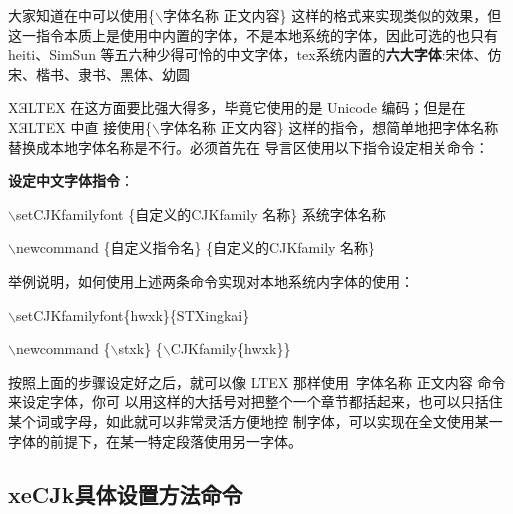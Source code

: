 \documentclass[10pt,a4paper,openany]{article}
\newcommand{\song}{\CJKfamily{song}} %
\begin{document}
	大家知道在\LaTeXe 中可以使用\{$ \backslash $字体名称 正文内容\} 这样的格式来实现类似的效果，但这一指令本质上是使用\LaTeXe 中内置的字体，不是本地系统的字体，因此可选的也只有 heiti、SimSun 等五六种少得可怜的中文字体，tex系统内置的\textbf{六大字体}:{\song 宋体}、{\fangsong 仿宋}、{\kaishu 楷书}、{\lishu 隶书}、{\heiti 黑体}、{\youyuan 幼圆}
	
	XƎLTEX 在这方面要比\LaTeXe 强大得多，毕竟它使用的是 Unicode 编码；但是在 XƎLTEX 中直 接使用\{$ \backslash $字体名称 正文内容\} 这样的指令，想简单地把字体名称替换成本地字体名称是不行。必须首先在 导言区使用以下指令设定相关命令：
	
	\textbf{设定中文字体指令}：
	
    $ \backslash $setCJKfamilyfont \{自定义的CJKfamily 名称\} {系统字体名称}
	
	$ \backslash $newcommand \{自定义指令名\} \{自定义的CJKfamily 名称\}
	
	举例说明，如何使用上述两条命令实现对本地系统内字体的使用：
	
	$ \backslash $setCJKfamilyfont\{hwxk\}\{STXingkai\}
	
	$ \backslash $newcommand \{$\backslash $stxk\} \{$ \backslash $CJKfamily\{hwxk\}\}
	
	 
	按照上面的步骤设定好之后，就可以像 LTEX 那样使用{\ 字体名称 正文内容} 命令来设定字体，你可 以用这样的大括号对把整个一个章节都括起来，也可以只括住某个词或字母，如此就可以非常灵活方便地控 制字体，可以实现在全文使用某一字体的前提下，在某一特定段落使用另一字体。


	\subsection{xeCJk具体设置方法命令}
	
\end{document}
